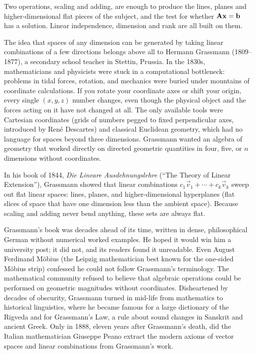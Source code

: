 \begin{aestheticbox}
Two operations, scaling and adding, are enough to produce the lines, planes and higher-dimensional
flat pieces of the subject, and the test for whether $\mathbf{A}\mathbf{x}=\mathbf{b}$ has a solution.
Linear independence, dimension and rank are all built on them.
\end{aestheticbox}

\begin{historybox}
The idea that spaces of any dimension can be generated by taking linear combinations of a few
directions belongs above all to Hermann Grassmann (1809--1877), a secondary school teacher
in Stettin, Prussia. In the 1830s, mathematicians and physicists were stuck in a computational bottleneck:
problems in tidal forces, rotation, and mechanics were buried under mountains of coordinate calculations.
If you rotate your coordinate axes or shift your origin, every single $(x,y,z)$ number changes, even though
the physical object and the forces acting on it have not changed at all. The only available tools were
Cartesian coordinates (grids of numbers pegged to fixed perpendicular axes, introduced by Ren\'e Descartes)
and classical Euclidean geometry, which had no language for spaces beyond three dimensions. Grassmann wanted
an algebra of geometry that worked directly on directed geometric quantities in four, five, or $n$ dimensions
without coordinates.

In his book of 1844, \emph{Die Lineare Ausdehnungslehre} (``The Theory of Linear Extension''), Grassmann
showed that linear combinations $c_1 \vec{v}_1 + \cdots + c_k \vec{v}_k$ sweep out flat linear spaces:
lines, planes, and higher-dimensional hyperplanes (flat slices of space that have one dimension less than the
ambient space). Because scaling and adding never bend anything, these sets are always flat.

Grassmann's book was decades ahead of its time, written in dense, philosophical German without numerical
worked examples. He hoped it would win him a university post; it did not, and its readers found it
unreadable. Even August Ferdinand M\"obius (the Leipzig mathematician best known
for the one-sided M\"obius strip) confessed he could not follow Grassmann's terminology. The mathematical
community refused to believe that algebraic operations could be performed on geometric magnitudes without
coordinates. Disheartened by decades of obscurity, Grassmann turned in mid-life from mathematics to
historical linguistics, where he became famous for a large dictionary of the Rigveda and for
Grassmann's Law, a rule about sound changes in Sanskrit and ancient Greek. Only in 1888, eleven
years after Grassmann's death, did the Italian mathematician Giuseppe Peano extract the modern axioms of
vector spaces and linear combinations from Grassmann's work.


\end{historybox}
